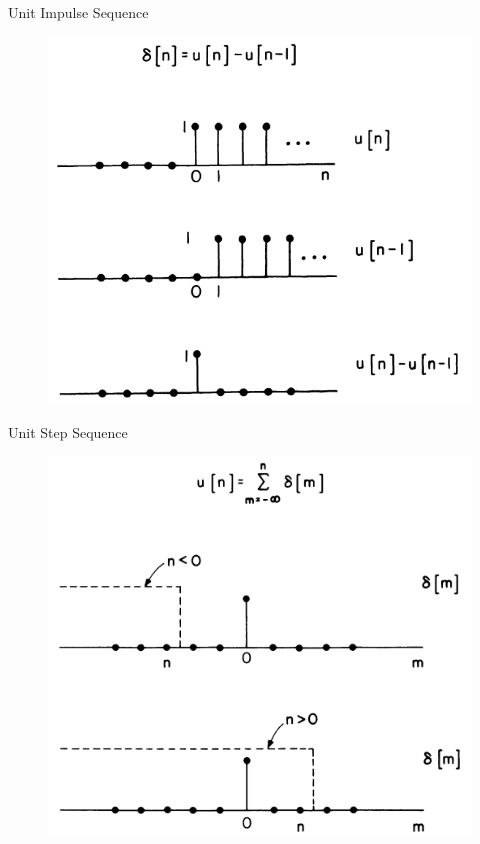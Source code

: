 \documentclass[pdflatex,compress,mathserif]{beamer}
\begin{document}
\begin{frame}{Unit Impulse Sequence}
	\begin{figure}
		\centering
		\includegraphics[height=0.8\textheight]{img/02.slide_02}
	\end{figure}
\end{frame}

\begin{frame}{Unit Step Sequence}
	\begin{figure}
		\centering
		\includegraphics[height=0.8\textheight]{img/02.slide_03}
	\end{figure}
\end{frame}
\end{document}

